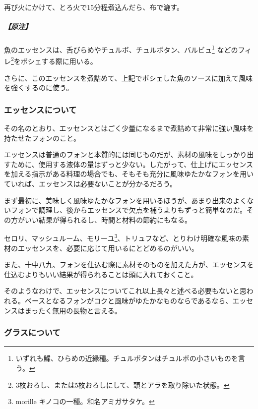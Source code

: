 \begin{recette}
再び火にかけて、とろ火で15分程煮込んだら、布で漉す。

\hypertarget{nota-essence-de-poisson}{%
\subparagraph{【原注】}\label{nota-essence-de-poisson}}

魚のエッセンスは、舌びらめやチュルボ、チュルボタン、バルビュ\footnote{いずれも鰈、ひらめの近縁種。チュルボタンはチュルボの小さいものを言う。}
などのフィレ\footnote{3枚おろし、または5枚おろしにして、頭とアラを取り除いた状態。}をポシェする際に用いる。

さらに、このエッセンスを煮詰めて、上記でポシェした魚のソースに加えて風味を強くするのに使う。

\hypertarget{essences-diverses}{%
\subsubsection{エッセンスについて}\label{essences-diverses}}



その名のとおり、エッセンスとはごく少量になるまで煮詰めて非常に強い風味を持たせたフォンのこと。

エッセンスは普通のフォンと本質的には同じものだが、素材の風味をしっかり出すために、使用する液体の量はずっと少ない。したがって、仕上げにエッセンスを加える指示がある料理の場合でも、そもそも充分に風味ゆたかなフォンを用いていれば、エッセンスは必要ないことが分かるだろう。

まず最初に、美味しく風味ゆたかなフォンを用いるほうが、あまり出来のよくないフォンで調理し、後からエッセンスで欠点を補うよりもずっと簡単なのだ。その方がいい結果が得られるし、時間と材料の節約にもなる。

セロリ、マッシュルーム、モリーユ\footnote{morille
  キノコの一種。和名アミガサタケ。}、トリュフなど、とりわけ明確な風味の素材のエッセンスを、必要に応じて用いるにとどめるのがいい。

また、十中八九、フォンを仕込む際に素材そのものを加えた方が、エッセンスを仕込むよりもいい結果が得られることは頭に入れておくこと。

そのようなわけで、エッセンスについてこれ以上長々と述べる必要もないと思われる。ベースとなるフォンがコクと風味がゆたかなものならであるなら、エッセンスはまったく無用の長物と言える。

\hypertarget{glaces-diverses}{%
\subsubsection{グラスについて}\label{glaces-diverses}}


\end{recette}
